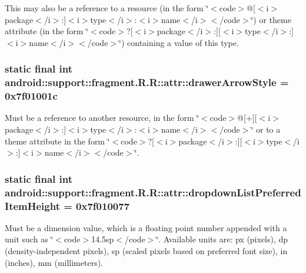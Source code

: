 This may also be a reference to a resource (in the form \char`\"{}$<$code$>$@\mbox{[}$<$i$>$package$<$/i$>$:\mbox{]}$<$i$>$type$<$/i$>$:$<$i$>$name$<$/i$>$$<$/code$>$\char`\"{}) or theme attribute (in the form \char`\"{}$<$code$>$?\mbox{[}$<$i$>$package$<$/i$>$:\mbox{]}\mbox{[}$<$i$>$type$<$/i$>$:\mbox{]}$<$i$>$name$<$/i$>$$<$/code$>$\char`\"{}) containing a value of this type. \hypertarget{classandroid_1_1support_1_1fragment_1_1_r_1_1attr_c725e5fa2bf513ecb33ba96de4d98bde}{
\subsubsection[{drawerArrowStyle}]{\setlength{\rightskip}{0pt plus 5cm}static final int android::support::fragment.R.R::attr::drawerArrowStyle = 0x7f01001c}}
\label{classandroid_1_1support_1_1fragment_1_1_r_1_1attr_c725e5fa2bf513ecb33ba96de4d98bde}


Must be a reference to another resource, in the form \char`\"{}$<$code$>$@\mbox{[}+\mbox{]}\mbox{[}$<$i$>$package$<$/i$>$:\mbox{]}$<$i$>$type$<$/i$>$:$<$i$>$name$<$/i$>$$<$/code$>$\char`\"{} or to a theme attribute in the form \char`\"{}$<$code$>$?\mbox{[}$<$i$>$package$<$/i$>$:\mbox{]}\mbox{[}$<$i$>$type$<$/i$>$:\mbox{]}$<$i$>$name$<$/i$>$$<$/code$>$\char`\"{}. \hypertarget{classandroid_1_1support_1_1fragment_1_1_r_1_1attr_9a1f639dcb9a00261d7b55b4e8c3abae}{
\subsubsection[{dropdownListPreferredItemHeight}]{\setlength{\rightskip}{0pt plus 5cm}static final int android::support::fragment.R.R::attr::dropdownListPreferredItemHeight = 0x7f010077}}
\label{classandroid_1_1support_1_1fragment_1_1_r_1_1attr_9a1f639dcb9a00261d7b55b4e8c3abae}


Must be a dimension value, which is a floating point number appended with a unit such as \char`\"{}$<$code$>$14.5sp$<$/code$>$\char`\"{}. Available units are: px (pixels), dp (density-independent pixels), sp (scaled pixels based on preferred font size), in (inches), mm (millimeters). 

